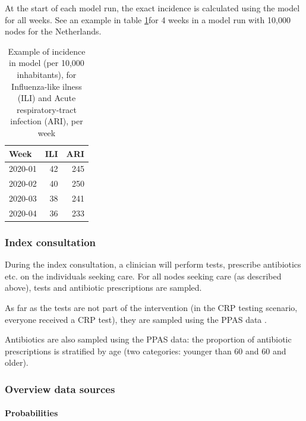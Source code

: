 \documentclass[
]{article}
\begin{document}
At the start of each model run, the exact incidence is calculated using the model for all weeks. See an example in table \ref{tab:example-incidence}for 4 weeks in a model run with 10,000 nodes for the Netherlands.

\begin{table}

\caption{\label{tab:example-incidence}Example of incidence in model (per 10,000 inhabitants), for Influenza-like ilness (ILI) and Acute respiratory-tract infection (ARI), per week}
\centering
\begin{tabular}[t]{l|r|r}
\hline
Week & ILI & ARI\\
\hline
2020-01 & 42 & 245\\
\hline
2020-02 & 40 & 250\\
\hline
2020-03 & 38 & 241\\
\hline
2020-04 & 36 & 233\\
\hline
\end{tabular}
\end{table}

\hypertarget{index-consultation}{%
\subsubsection{Index consultation}\label{index-consultation}}

During the index consultation, a clinician will perform tests, prescribe antibiotics etc. on the individuals seeking care. For all nodes seeking care (as described above), tests and antibiotic prescriptions are sampled.

As far as the tests are not part of the intervention (in the CRP testing scenario, everyone received a CRP test), they are sampled using the PPAS data \autocite{veldenPrimaryCarePatients2021}.

Antibiotics are also sampled using the PPAS data: the proportion of antibiotic prescriptions is stratified by age (two categories: younger than 60 and 60 and older).

\hypertarget{overview-data-sources-1}{%
\subsubsection{Overview data sources}\label{overview-data-sources-1}}

\hypertarget{probabilities}{%
\paragraph{Probabilities}\label{probabilities}}
\end{document}
